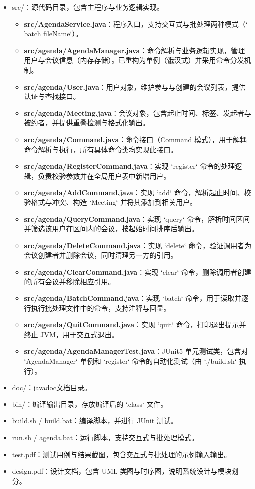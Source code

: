 \begin{itemize}
  \item src/：源代码目录，包含主程序与业务逻辑实现。
    \begin{itemize}
    \item \textbf{src/AgendaService.java}：程序入口，支持交互式与批处理两种模式（`-batch fileName`）。
    \item \textbf{src/agenda/AgendaManager.java}：命令解析与业务逻辑实现，管理用户与会议信息（内存存储）。已重构为单例（饿汉式）并采用命令分发机制。
    \item \textbf{src/agenda/User.java}：用户对象，维护参与与创建的会议列表，提供认证与查找接口。
    \item \textbf{src/agenda/Meeting.java}：会议对象，包含起止时间、标签、发起者与被约者，并提供重叠检测与格式化输出。
    \item \textbf{src/agenda/Command.java}：命令接口（Command 模式），用于解耦命令解析与执行，所有具体命令类均实现此接口。
    \item \textbf{src/agenda/RegisterCommand.java}：实现 `register` 命令的处理逻辑，负责校验参数并在全局用户表中新增用户。
    \item \textbf{src/agenda/AddCommand.java}：实现 `add` 命令，解析起止时间、校验格式与冲突、构造 `Meeting` 并将其添加到相关用户。
    \item \textbf{src/agenda/QueryCommand.java}：实现 `query` 命令，解析时间区间并筛选该用户在区间内的会议，按起始时间排序后输出。
    \item \textbf{src/agenda/DeleteCommand.java}：实现 `delete` 命令，验证调用者为会议创建者并删除会议，同时清理另一方的引用。
    \item \textbf{src/agenda/ClearCommand.java}：实现 `clear` 命令，删除调用者创建的所有会议并移除相应引用。
    \item \textbf{src/agenda/BatchCommand.java}：实现 `batch` 命令，用于读取并逐行执行批处理文件中的命令，支持注释与回显。
    \item \textbf{src/agenda/QuitCommand.java}：实现 `quit` 命令，打印退出提示并终止 JVM，用于交互式退出。
    \item \textbf{src/agenda/AgendaManagerTest.java}：JUnit5 单元测试类，包含对 `AgendaManager` 单例和 `register` 命令的自动化测试（由 `./build.sh` 执行）。
    \end{itemize}
  \item doc/：javadoc文档目录。
  \item bin/：编译输出目录，存放编译后的 `.class` 文件。
  \item build.sh / build.bat：编译脚本，并进行 JUnit 测试。
  \item run.sh / agenda.bat：运行脚本，支持交互式与批处理模式。
  \item test.pdf：测试用例与结果截图，包含交互式与批处理的示例输入输出。
  \item design.pdf：设计文档，包含 UML 类图与时序图，说明系统设计与模块划分。
\end{itemize}


